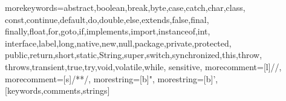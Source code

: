 %
%
  {morekeywords={abstract,boolean,break,byte,case,catch,char,class,%
      const,continue,default,do,double,else,extends,false,final,%
      finally,float,for,goto,if,implements,import,instanceof,int,%
      interface,label,long,native,new,null,package,private,protected,%
      public,return,short,static,String,super,switch,synchronized,this,throw,%
      throws,transient,true,try,void,volatile,while},%
   sensitive,%
   morecomment=[l]//,%
   morecomment=[s]{/*}{*/},%
   morestring=[b]",%
   morestring=[b]',%
  }[keywords,comments,strings]%

